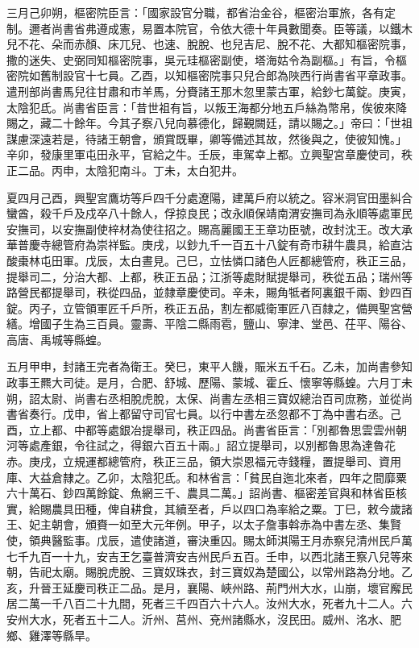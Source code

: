 \begin{pinyinscope}
 三月己卯朔，樞密院臣言：「國家設官分職，都省治金谷，樞密治軍旅，各有定制。邇者尚書省弗遵成憲，易置本院官，令依大德十年員數聞奏。臣等議，以鐵木兒不花、朵而赤顏、床兀兒、也速、脫脫、也兒吉尼、脫不花、大都知樞密院事，撒的迷失、史弼同知樞密院事，吳元珪樞密副使，塔海姑令為副樞。」有旨，令樞密院如舊制設官十七員。乙酉，以知樞密院事只兒合郎為陜西行尚書省平章政事。遣刑部尚書馬兒往甘肅和市羊馬，分賚諸王那木忽里蒙古軍，給鈔七萬錠。庚寅，太陰犯氐。尚書省臣言：「昔世祖有旨，以叛王海都分地五戶絲為幣帛，俟彼來降賜之，藏二十餘年。今其子察八兒向慕德化，歸覲闕廷，請以賜之。」帝曰：「世祖謀慮深遠若是，待諸王朝會，頒賞既畢，卿等備述其故，然後與之，使彼知愧。」辛卯，發康里軍屯田永平，官給之牛。壬辰，車駕幸上都。立興聖宮章慶使司，秩正二品。丙申，太陰犯南斗。丁未，太白犯井。



 夏四月己酉，興聖宮鷹坊等戶四千分處遼陽，建萬戶府以統之。容米洞官田墨糾合蠻酋，殺千戶及戍卒八十餘人，俘掠良民；改永順保靖南渭安撫司為永順等處軍民安撫司，以安撫副使梓材為使往招之。賜高麗國王王章功臣號，改封沈王。改大承華普慶寺總管府為崇祥監。庚戌，以鈔九千一百五十八錠有奇市耕牛農具，給直沽酸棗林屯田軍。戊辰，太白晝見。己巳，立怯憐口諸色人匠都總管府，秩正三品，提舉司二，分治大都、上都，秩正五品；江浙等處財賦提舉司，秩從五品；瑞州等路營民都提舉司，秩從四品，並隸章慶使司。辛未，賜角牴者阿裏銀千兩、鈔四百錠。丙子，立管領軍匠千戶所，秩正五品，割左都威衛軍匠八百隸之，備興聖宮營繕。增國子生為三百員。靈壽、平陰二縣雨雹，鹽山、寧津、堂邑、茌平、陽谷、高唐、禹城等縣蝗。



 五月甲申，封諸王完者為衛王。癸巳，東平人饑，賑米五千石。乙未，加尚書參知政事王羆大司徒。是月，合肥、舒城、歷陽、蒙城、霍丘、懷寧等縣蝗。六月丁未朔，詔太尉、尚書右丞相脫虎脫，太保、尚書左丞相三寶奴總治百司庶務，並從尚書省奏行。戊申，省上都留守司官七員。以行中書左丞忽都不丁為中書右丞。己酉，立上都、中都等處銀冶提舉司，秩正四品。尚書省臣言：「別都魯思雲雲州朝河等處產銀，令往試之，得銀六百五十兩。」詔立提舉司，以別都魯思為達魯花赤。庚戌，立規運都總管府，秩正三品，領大崇恩福元寺錢糧，置提舉司、資用庫、大益倉隸之。乙卯，太陰犯氐。和林省言：「貧民自迤北來者，四年之間靡粟六十萬石、鈔四萬餘錠、魚網三千、農具二萬。」詔尚書、樞密差官與和林省臣核實，給賜農具田種，俾自耕食，其續至者，戶以四口為率給之粟。丁巳，敕今歲諸王、妃主朝會，頒賚一如至大元年例。甲子，以太子詹事斡赤為中書左丞、集賢使，領典醫監事。戊辰，遣使諸道，審決重囚。賜太師淇陽王月赤察兒清州民戶萬七千九百一十九，安吉王乞臺普濟安吉州民戶五百。壬申，以西北諸王察八兒等來朝，告祀太廟。賜脫虎脫、三寶奴珠衣，封三寶奴為楚國公，以常州路為分地。乙亥，升晉王延慶司秩正二品。是月，襄陽、峽州路、荊門州大水，山崩，壞官廨民居二萬一千八百二十九間，死者三千四百六十六人。汝州大水，死者九十二人。六安州大水，死者五十二人。沂州、莒州、兗州諸縣水，沒民田。威州、洺水、肥鄉、雞澤等縣旱。




\end{pinyinscope}
